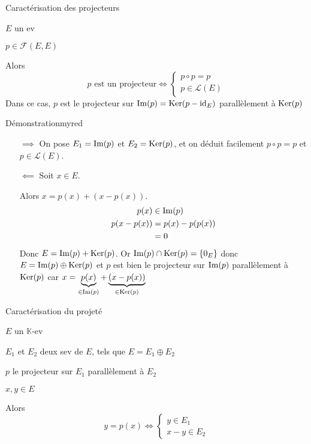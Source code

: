     \begin{theo}{Caractérisation des projecteurs}{}
        \begin{soient}
            \item $E$ un ev
            \item $p \in \mathcal{F}(E,E)$
        \end{soient}
        Alors \[ p \text{ est un projecteur} \iff \left\{ \begin{array}{l}
            p \circ p = p \\
            p \in \mathcal{L}(E)
        \end{array} \right. \]
        Dans ce cas, $p$ est le projecteur sur $\operatorname{Im}(p) = \operatorname{Ker}(p-\operatorname{id}_E)$ parallèlement à $\operatorname{Ker}(p)$
    \end{theo}
    
    \begin{demo}{Démonstration}{myred}
        \begin{itemize}
            \item[$\implies$] On pose $E_1 = \operatorname{Im}(p)$ et $E_2 = \operatorname{Ker}(p)$, et on déduit facilement $p \circ p = p$ et $p \in \mathcal{L}(E)$.
            \item[$\impliedby$] Soit $x \in E$.
    
            Alors $x = p(x) + (x-p(x))$.
            \begin{align*}
                p(x) & \in \operatorname{Im}(p) \\
                p(x-p(x)) &= p(x)-p(p(x)) \\
                 & = 0
            \end{align*} 
            Donc $E = \operatorname{Im}(p) + \operatorname{Ker}(p)$. Or $\operatorname{Im}(p) \cap \operatorname{Ker}(p) = \{ 0_E \}$ donc $E = \operatorname{Im}(p) \oplus \operatorname{Ker}(p)$ et $p$ est bien le projecteur sur $\operatorname{Im}(p)$ parallèlement à $\operatorname{Ker}(p)$ car $x = \underbrace{p(x)}_{\in \operatorname{Im}(p)} + \underbrace{(x -p(x))}_{\in \operatorname{Ker}(p)}$
        \end{itemize}
    \end{demo}
    
    \begin{prop}{Caractérisation du projeté}{}
        \begin{soient}
            \item $E$ un $\mathbb{K}$-ev
            \item $E_1$ et $E_2$ deux sev de $E$, tels que $E = E_1 \oplus E_2$
            \item $p$ le projecteur sur $E_1$ parallèlement à $E_2$
            \item $x,y \in E$
        \end{soient}
        Alors \[ y = p(x) \iff \left\{ \begin{array}{l}
            y \in E_1 \\
            x-y \in E_2
        \end{array} \right. \]
    \end{prop}
    
